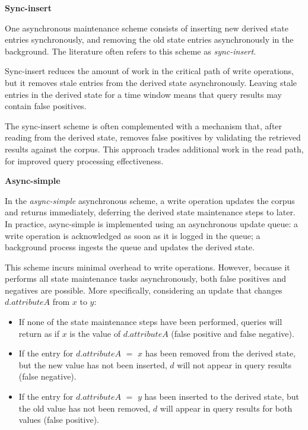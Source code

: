 

\bigskip
\noindent
\textbf{Sync-insert}

\noindent
One asynchronous maintenance scheme consists of inserting new derived state entries synchronously,
and removing the old state entries asynchronously in the background.
The literature often refers to this scheme as \textit{sync-insert}.

Sync-insert reduces the amount of work in the critical path of write operations,
but it removes stale entries from the derived state asynchronously.
Leaving stale entries in the derived state for a time window means that query results may contain false positives.

The sync-insert scheme is often complemented with a mechanism that,
after reading from the derived state, removes false positives by validating the retrieved results against
the corpus.
This approach trades additional work in the read path, for improved query processing effectiveness.

\bigskip
\noindent
\textbf{Async-simple}

\noindent
In the \textit{async-simple} asynchronous scheme,
a write operation updates the corpus and returns immediately,
deferring the derived state maintenance steps to later.
In practice, async-simple is implemented using an asynchronous update queue:
a write operation is acknowledged as soon as it is logged in the queue;
a background process ingests the queue and updates the derived state.

This scheme incurs minimal overhead to write operations.
However, because it performs all state maintenance tasks asynchronously,
both false positives and negatives are possible.
More specifically, considering an update that changes $d.attributeA$ from $x$ to $y$:
\begin{itemize}
  \item If none of the state maintenance steps have been performed, queries will return as if $x$ is the value of $d.attributeA$
  (false positive and false negative).

  \item If the entry for $d.attributeA$ $=$ $x$ has been removed from the derived state, but the new value has not been
  inserted, $d$ will not appear in query results (false negative).

  \item If the entry for $d.attributeA$ $=$ $y$ has been inserted to the derived state, but the old value has not been
  removed, $d$ will appear in query results for both values (false positive).
\end{itemize}

